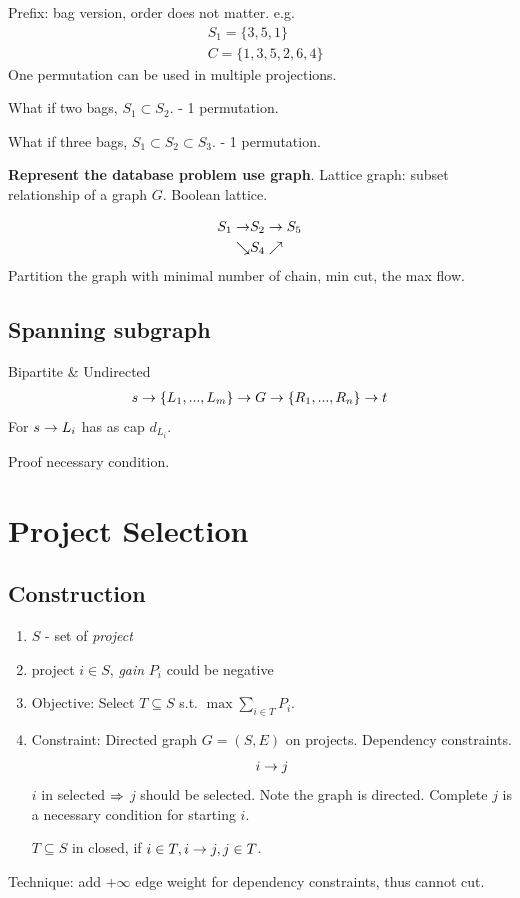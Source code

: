 \documentclass[a4paper]{report}
\theoremstyle{definition}
\begin{document}
Prefix: bag version, order does not matter. e.g.
\begin{align*}
& S_1 = \{3, 5, 1\} \\
& C= \{1, 3,5, 2, 6, 4\}
\end{align*}
One permutation can be used in multiple projections.

What if two bags, $S_1 \subset S_2$. - 1 permutation.

What if three bags, $S_1 \subset S_2 \subset S_3$. - 1 permutation.

\textbf{Represent the database problem use graph}. Lattice graph: subset relationship of a graph $G$. Boolean lattice.

\begin{align*}
S_1 \rightarrow & S_2 \rightarrow S_5\\
\searrow & S_4 \nearrow
\end{align*}
Partition the graph with minimal number of chain, min cut, the max flow.
\subsection{Spanning subgraph}
Bipartite \& Undirected
\begin{align*}
s \rightarrow \{L_1, ..., L_m\} \rightarrow G \rightarrow \{R_1, ..., R_n\} \rightarrow t
\end{align*}
For $s \rightarrow L_i$ has as cap $d_{L_i}$.

Proof necessary condition.

\section{Project Selection}
\subsection{Construction}
\begin{enumerate}
\item $S$ - set of \textit{project}
\item project $i\in S$, \textit{gain} $P_i$ could be negative
\item Objective: Select $T\subseteq S$ s.t. $\max \sum_{i\in T} P_i$.
\item Constraint: Directed graph $G=(S, E)$ on projects. Dependency constraints.
$$
i \rightarrow j
$$
$i$ in selected $\Rightarrow$ $j$ should be selected. Note the graph is directed. Complete $j$ is a necessary condition for starting $i$.

$T\subseteq S$ in closed, if $i\in T, i\rightarrow j, j \in T$.
\end{enumerate}
Technique: add $+\infty$ edge weight for dependency constraints, thus cannot cut. 
\end{document}
